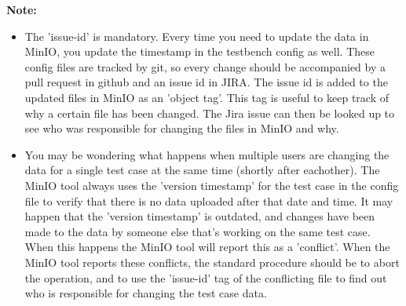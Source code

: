 \documentclass{deltares_memo}
\begin{document}
\textbf{Note:}
\begin{itemize}
	\item The 'issue-id' is mandatory. Every time you need to update the data in MinIO, you update the timestamp in the testbench config as well. These config files are tracked by git, so every change should be accompanied by a pull request in github and an issue id in JIRA. The issue id is added to the updated files in MinIO as an 'object tag'. This tag is useful to keep track of why a certain file has been changed. The Jira issue can then be looked up to see who was responsible for changing the files in MinIO and why.
	\item You may be wondering what happens when multiple users are changing the data for a single test case at the same time (shortly after eachother). The MinIO tool always uses the 'version timestamp' for the test case in the config file to verify that there is no data uploaded after that date and time. It may happen that the 'version timestamp' is outdated, and changes have been made to the data by someone else that's working on the same test case. When this happens the MinIO tool will report this as a 'conflict'. When the MinIO tool reports these conflicts, the standard procedure should be to abort the operation, and to use the 'issue-id' tag of the conflicting file to find out who is responsible for changing the test case data.
\end{itemize}
\end{document}
